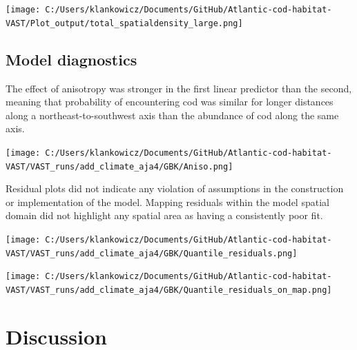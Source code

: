 \documentclass[
]{article}
\let\origfigure\figure
\let\endorigfigure\endfigure
\renewenvironment{figure}[1][2] {
    \expandafter\origfigure\expandafter[H]
} {
    \endorigfigure
}
\begin{document}
\begin{figure}
\centering
\texttt{[image: C:/Users/klankowicz/Documents/GitHub/Atlantic-cod-habitat-VAST/Plot\_output/total\_spatialdensity\_large.png]}
\caption{Figure 23: Large cod aggregate spatial density split by season, 1982 - 2021.}
\end{figure}

\hypertarget{model-diagnostics}{%
\subsection{Model diagnostics}\label{model-diagnostics}}

The effect of anisotropy was stronger in the first linear predictor than the second, meaning that probability of encountering cod was similar for longer distances along a northeast-to-southwest axis than the abundance of cod along the same axis.

\begin{figure}
\centering
\texttt{[image: C:/Users/klankowicz/Documents/GitHub/Atlantic-cod-habitat-VAST/VAST\_runs/add\_climate\_aja4/GBK/Aniso.png]}
\caption{Figure 24: Anisotropic effect in the first and second linear predictors}
\end{figure}

Residual plots did not indicate any violation of assumptions in the construction or implementation of the model. Mapping residuals within the model spatial domain did not highlight any spatial area as having a consistently poor fit.

\begin{figure}
\centering
\texttt{[image: C:/Users/klankowicz/Documents/GitHub/Atlantic-cod-habitat-VAST/VAST\_runs/add\_climate\_aja4/GBK/Quantile\_residuals.png]}
\caption{Figure 25: Quantile residuals of model run}
\end{figure}

\begin{figure}
\centering
\texttt{[image: C:/Users/klankowicz/Documents/GitHub/Atlantic-cod-habitat-VAST/VAST\_runs/add\_climate\_aja4/GBK/Quantile\_residuals\_on\_map.png]}
\caption{Figure 26: Quantile residuals of model run in spatial domain for every time step}
\end{figure}

\hypertarget{discussion}{%
\section{Discussion}\label{discussion}}
\end{document}
